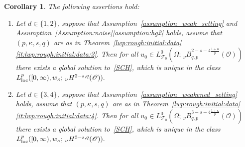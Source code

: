 \documentclass[reqno]{amsart}
\newtheorem{corollary}[Satz]{Corollary}
\newcommand{\F}{\mathscr{F}}
\newcommand{\sO}{\mathscr{O}}
\newcommand{\1}{\mathbf{1}}
\newcommand{\loc}{\textup{loc}}
\newcommand{\nH}{\ensuremath{\,_\nu H}}
\newcommand{\bpsn}[1]{\ensuremath{\nH^{#1}(\sO)}}
\begin{document}
    \begin{corollary}\label{cor:GWP:rough}
    The following assertions hold:
    \begin{enumerate}
        \item Let $d\in\{1,2\}$, suppose that Assumption~\ref{assumption_weak_setting} and Assumption~\ref{Assumption:noise}\ref{assumption:hg2} holds, assume that $(p,\kappa,s,q)$ are as in Theorem~\ref{lwp:rough:initial:data}\ref{it:lwp:rough:initial:data:2}. Then for all $u_0\in L^0_{\F_0}(\Omega;\,_\nu B_{q,p}^{2-s-4\frac{1+\kappa}{p}}(\sO))$ there exists a global solution to~\eqref{SCH}, which is unique in the class $L^p_\loc([0,\infty),w_\kappa;\bpsn{2-s,q}).$
        \item Let $d\in\{3,4\}$, suppose that Assumption~\ref{assumption_weakened_setting} holds,  assume that $(p,\kappa,s,q)$ are as in Theorem~\ref{lwp:rough:initial:data}\ref{it:lwp:rough:initial:data:4}. Then for all $u_0\in L^0_{\F_0}(\Omega;\,_\nu B_{q,p}^{3-s-4\frac{1+\kappa}{p}}(\sO))$ there exists a global solution to~\eqref{SCH}, which is unique in the class $L^p_\loc([0,\infty),w_\kappa;\bpsn{3-s,q}).$
    \end{enumerate}
    \end{corollary}
\end{document}

